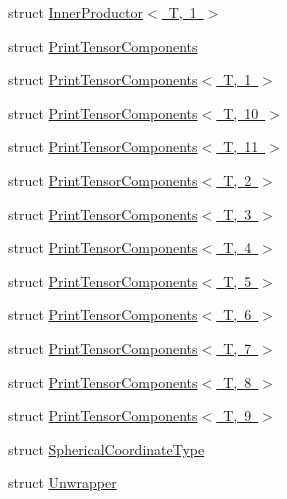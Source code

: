 \begin{DoxyCompactItemize}
\item 
struct \mbox{\hyperlink{structmpc_1_1utilities_1_1_inner_productor_3_01_t_00_011_01_4}{Inner\+Productor$<$ T, 1 $>$}}
\item 
struct \mbox{\hyperlink{structmpc_1_1utilities_1_1_print_tensor_components}{Print\+Tensor\+Components}}
\item 
struct \mbox{\hyperlink{structmpc_1_1utilities_1_1_print_tensor_components_3_01_t_00_011_01_4}{Print\+Tensor\+Components$<$ T, 1 $>$}}
\item 
struct \mbox{\hyperlink{structmpc_1_1utilities_1_1_print_tensor_components_3_01_t_00_0110_01_4}{Print\+Tensor\+Components$<$ T, 10 $>$}}
\item 
struct \mbox{\hyperlink{structmpc_1_1utilities_1_1_print_tensor_components_3_01_t_00_0111_01_4}{Print\+Tensor\+Components$<$ T, 11 $>$}}
\item 
struct \mbox{\hyperlink{structmpc_1_1utilities_1_1_print_tensor_components_3_01_t_00_012_01_4}{Print\+Tensor\+Components$<$ T, 2 $>$}}
\item 
struct \mbox{\hyperlink{structmpc_1_1utilities_1_1_print_tensor_components_3_01_t_00_013_01_4}{Print\+Tensor\+Components$<$ T, 3 $>$}}
\item 
struct \mbox{\hyperlink{structmpc_1_1utilities_1_1_print_tensor_components_3_01_t_00_014_01_4}{Print\+Tensor\+Components$<$ T, 4 $>$}}
\item 
struct \mbox{\hyperlink{structmpc_1_1utilities_1_1_print_tensor_components_3_01_t_00_015_01_4}{Print\+Tensor\+Components$<$ T, 5 $>$}}
\item 
struct \mbox{\hyperlink{structmpc_1_1utilities_1_1_print_tensor_components_3_01_t_00_016_01_4}{Print\+Tensor\+Components$<$ T, 6 $>$}}
\item 
struct \mbox{\hyperlink{structmpc_1_1utilities_1_1_print_tensor_components_3_01_t_00_017_01_4}{Print\+Tensor\+Components$<$ T, 7 $>$}}
\item 
struct \mbox{\hyperlink{structmpc_1_1utilities_1_1_print_tensor_components_3_01_t_00_018_01_4}{Print\+Tensor\+Components$<$ T, 8 $>$}}
\item 
struct \mbox{\hyperlink{structmpc_1_1utilities_1_1_print_tensor_components_3_01_t_00_019_01_4}{Print\+Tensor\+Components$<$ T, 9 $>$}}
\item 
struct \mbox{\hyperlink{structmpc_1_1utilities_1_1_spherical_coordinate_type}{Spherical\+Coordinate\+Type}}
\item 
struct \mbox{\hyperlink{structmpc_1_1utilities_1_1_unwrapper}{Unwrapper}}
\item 

\end{DoxyCompactItemize}
